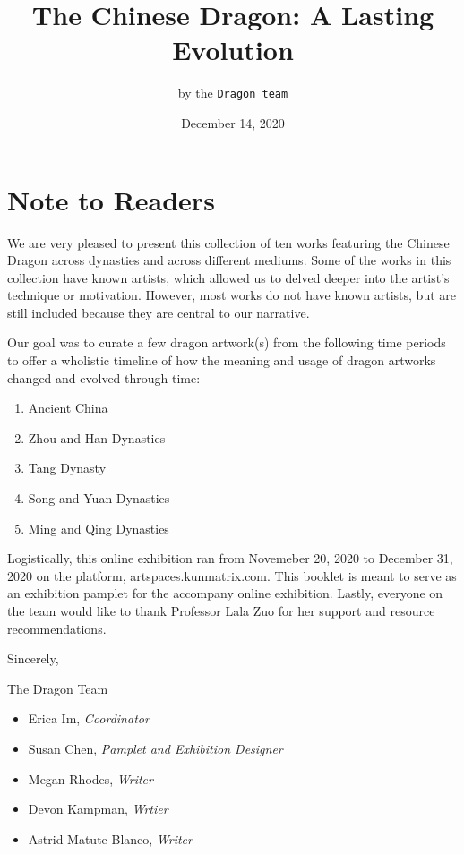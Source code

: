 \documentclass[
]{book}
\title{The Chinese Dragon: A Lasting Evolution}
\author{by the \texttt{Dragon\ team}}
\date{December 14, 2020}
\providecommand{\tightlist}{%
  \setlength{\itemsep}{0pt}\setlength{\parskip}{0pt}}
\begin{document}
\maketitle

{
\setcounter{tocdepth}{1}
\tableofcontents
}
\hypertarget{note-to-readers}{%
\chapter*{Note to Readers}\label{note-to-readers}}

We are very pleased to present this collection of ten works featuring the Chinese Dragon across dynasties and across different mediums. Some of the works in this collection have known artists, which allowed us to delved deeper into the artist's technique or motivation. However, most works do not have known artists, but are still included because they are central to our narrative.

Our goal was to curate a few dragon artwork(s) from the following time periods to offer a wholistic timeline of how the meaning and usage of dragon artworks changed and evolved through time:

\begin{enumerate}
\def\labelenumi{\arabic{enumi}.}
\tightlist
\item
  Ancient China
\item
  Zhou and Han Dynasties
\item
  Tang Dynasty
\item
  Song and Yuan Dynasties
\item
  Ming and Qing Dynasties
\end{enumerate}

Logistically, this online exhibition ran from Novemeber 20, 2020 to December 31, 2020 on the platform, artspaces.kunmatrix.com. This booklet is meant to serve as an exhibition pamplet for the accompany online exhibition. Lastly, everyone on the team would like to thank Professor Lala Zuo for her support and resource recommendations.

Sincerely,

The Dragon Team

\begin{itemize}
\tightlist
\item
  Erica Im, \emph{Coordinator}
\item
  Susan Chen, \emph{Pamplet and Exhibition Designer}
\item
  Megan Rhodes, \emph{Writer}
\item
  Devon Kampman, \emph{Wrtier}
\item
  Astrid Matute Blanco, \emph{Writer}
\end{itemize}
\end{document}
